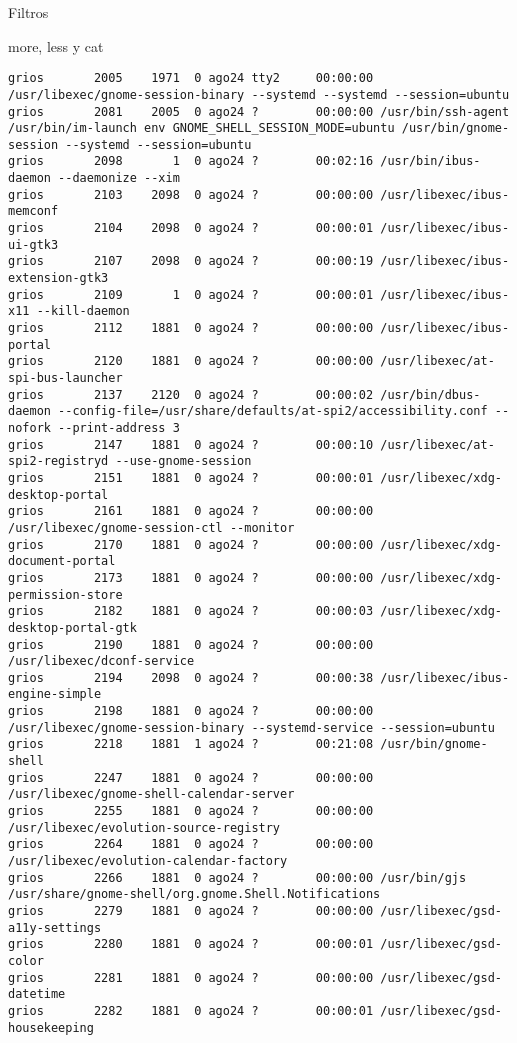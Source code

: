 \begin{section}{Filtros}
\begin{subsection}{more, less y cat}
\begin{lstlisting}[style=Ubuntu]
grios       2005    1971  0 ago24 tty2     00:00:00 /usr/libexec/gnome-session-binary --systemd --systemd --session=ubuntu
grios       2081    2005  0 ago24 ?        00:00:00 /usr/bin/ssh-agent /usr/bin/im-launch env GNOME_SHELL_SESSION_MODE=ubuntu /usr/bin/gnome-session --systemd --session=ubuntu
grios       2098       1  0 ago24 ?        00:02:16 /usr/bin/ibus-daemon --daemonize --xim
grios       2103    2098  0 ago24 ?        00:00:00 /usr/libexec/ibus-memconf
grios       2104    2098  0 ago24 ?        00:00:01 /usr/libexec/ibus-ui-gtk3
grios       2107    2098  0 ago24 ?        00:00:19 /usr/libexec/ibus-extension-gtk3
grios       2109       1  0 ago24 ?        00:00:01 /usr/libexec/ibus-x11 --kill-daemon
grios       2112    1881  0 ago24 ?        00:00:00 /usr/libexec/ibus-portal
grios       2120    1881  0 ago24 ?        00:00:00 /usr/libexec/at-spi-bus-launcher
grios       2137    2120  0 ago24 ?        00:00:02 /usr/bin/dbus-daemon --config-file=/usr/share/defaults/at-spi2/accessibility.conf --nofork --print-address 3
grios       2147    1881  0 ago24 ?        00:00:10 /usr/libexec/at-spi2-registryd --use-gnome-session
grios       2151    1881  0 ago24 ?        00:00:01 /usr/libexec/xdg-desktop-portal
grios       2161    1881  0 ago24 ?        00:00:00 /usr/libexec/gnome-session-ctl --monitor
grios       2170    1881  0 ago24 ?        00:00:00 /usr/libexec/xdg-document-portal
grios       2173    1881  0 ago24 ?        00:00:00 /usr/libexec/xdg-permission-store
grios       2182    1881  0 ago24 ?        00:00:03 /usr/libexec/xdg-desktop-portal-gtk
grios       2190    1881  0 ago24 ?        00:00:00 /usr/libexec/dconf-service
grios       2194    2098  0 ago24 ?        00:00:38 /usr/libexec/ibus-engine-simple
grios       2198    1881  0 ago24 ?        00:00:00 /usr/libexec/gnome-session-binary --systemd-service --session=ubuntu
grios       2218    1881  1 ago24 ?        00:21:08 /usr/bin/gnome-shell
grios       2247    1881  0 ago24 ?        00:00:00 /usr/libexec/gnome-shell-calendar-server
grios       2255    1881  0 ago24 ?        00:00:00 /usr/libexec/evolution-source-registry
grios       2264    1881  0 ago24 ?        00:00:00 /usr/libexec/evolution-calendar-factory
grios       2266    1881  0 ago24 ?        00:00:00 /usr/bin/gjs /usr/share/gnome-shell/org.gnome.Shell.Notifications
grios       2279    1881  0 ago24 ?        00:00:00 /usr/libexec/gsd-a11y-settings
grios       2280    1881  0 ago24 ?        00:00:01 /usr/libexec/gsd-color
grios       2281    1881  0 ago24 ?        00:00:00 /usr/libexec/gsd-datetime
grios       2282    1881  0 ago24 ?        00:00:01 /usr/libexec/gsd-housekeeping

\end{lstlisting}
\end{subsection}
\end{section}
